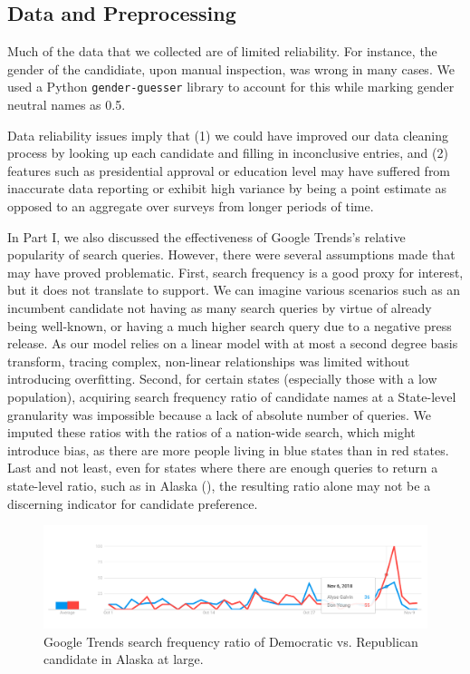 \documentclass[12pt]{article}
\begin{document}
\subsection{Data and Preprocessing}

Much of the data that we collected are of limited reliability. For instance, the gender of the candidiate, upon manual inspection, was wrong in many cases. We used a Python \texttt{gender-guesser} library to account for this while marking gender neutral names as 0.5. 

Data reliability issues imply that (1) we could have improved our data cleaning
process by looking up each candidate and filling in inconclusive entries, and
(2) features such as presidential approval or education level may have suffered
from inaccurate data reporting or exhibit high variance by being a point
estimate as opposed to an aggregate over surveys from longer periods of time.

In Part I, we also discussed the effectiveness of Google Trends's relative
popularity of search queries. However, there were several assumptions made that
may have proved problematic. First, search frequency is a good proxy
for interest, but it does not translate to support. We can imagine various
scenarios such as an incumbent candidate not having as many search queries by
virtue of already being well-known, or having a much higher search query due to
a negative press release. As our model relies on a linear model with at most a
second degree basis transform, tracing complex, non-linear relationships was
limited without introducing overfitting. Second, for certain
states (especially those with a low population), acquiring search frequency
ratio of candidate names at a State-level granularity was impossible because a
lack of absolute number of queries. We imputed these ratios with the ratios of a
nation-wide search, which might introduce bias, as there are more people living in blue states than in red states. Last and not least, even for states
where there are enough queries to return a state-level ratio, such as in Alaska
(), the resulting ratio alone may not be a discerning
indicator for candidate preference.

\begin{figure}[tb]
  \centering
  \includegraphics[scale=0.4]{alaska_candidate}
  \caption{Google Trends search frequency ratio of Democratic vs. Republican candidate in Alaska at large.}
  \label{fig:candidate_only}
\end{figure}
\end{document}
